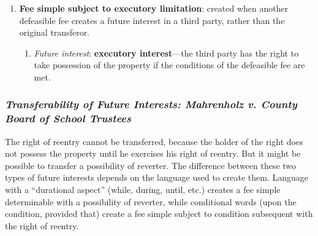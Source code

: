 \begin{enumerate}
\begin{enumerate}
{        short} or divested at the transferor's election when a stated 
        condition happens.''\footnote{Casebook p. 224.} It is created by 
        conditional language---``but if,'' ``provided,'' ''on condition 
        that.'' 
        \begin{enumerate}
            \item \emph{Future interest}: \textbf{Right of entry} (or power of 
            termination)---O can exercise his right to reclaim possession of 
            the property, but there will not be an automatic conveyance.
        \end{enumerate}
        \item \textbf{Fee simple subject to executory limitation}: created 
        when another defeasible fee creates a future interest in a third 
        party, rather than the original transferor.
        \begin{enumerate}
            \item \emph{Future interest}: \textbf{executory interest}---the 
            third party has the right to take possession of the property if 
            the conditions of the defeasible fee are met.
        \end{enumerate}
    \end{enumerate}
\end{enumerate}

\subsubsection{\emph{Transferability of Future Interests: Mahrenholz v. County 
Board of School Trustees}}

The right of reentry cannot be transferred,
because the holder of the right 
does not possess the property until he exercises his right of reentry. But it 
might be possible to transfer a possibility of reverter. The difference 
between these two types of future interests depends on the language used to 
create them. Language with a ``durational aspect'' (while, during, until, 
etc.) creates a fee simple determinable with a possibility of reverter, while 
conditional words (upon the condition, provided that) create a fee simple 
subject to condition subsequent with the right of reentry.

